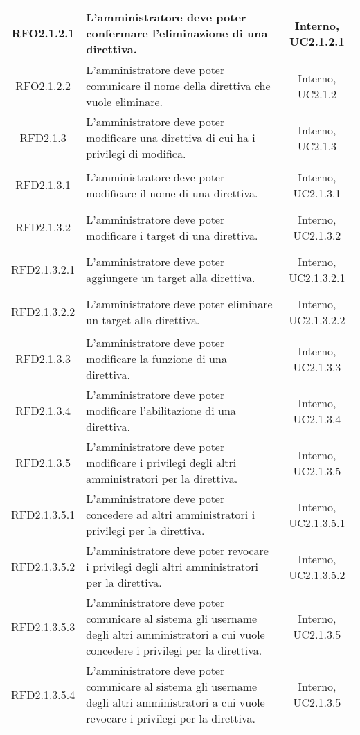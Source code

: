 \begin{longtable}{|c|>{\centering}m{7cm}|c|}
	\hypertarget{RFO2.1.2.1}{RFO2.1.2.1} & L'amministratore deve poter confermare l'eliminazione di una direttiva. & Interno, UC2.1.2.1\\ \hline
	\hypertarget{RFO2.1.2.2}{RFO2.1.2.2} & L'amministratore deve poter comunicare il nome della direttiva che vuole eliminare. & Interno, UC2.1.2\\ \hline
	\hypertarget{RFD2.1.3}{RFD2.1.3} & L'amministratore deve poter modificare una direttiva di cui ha i privilegi di modifica. & Interno, UC2.1.3\\ \hline
	\hypertarget{RFD2.1.3.1}{RFD2.1.3.1} & L'amministratore deve poter modificare il nome di una direttiva. & Interno, UC2.1.3.1\\ \hline
	\hypertarget{RFD2.1.3.2}{RFD2.1.3.2} & L'amministratore deve poter modificare i target di una direttiva. & Interno, UC2.1.3.2\\ \hline
	\hypertarget{RFD2.1.3.2.1}{RFD2.1.3.2.1} & L'amministratore deve poter aggiungere un target alla direttiva. & Interno, UC2.1.3.2.1\\ \hline
	\hypertarget{RFD2.1.3.2.2}{RFD2.1.3.2.2} & L'amministratore deve poter eliminare un target alla direttiva. & Interno, UC2.1.3.2.2\\ \hline
	\hypertarget{RFD2.1.3.3}{RFD2.1.3.3} & L'amministratore deve poter modificare la funzione di una direttiva. & Interno, UC2.1.3.3\\ \hline
	\hypertarget{RFD2.1.3.4}{RFD2.1.3.4} & L'amministratore deve poter modificare l'abilitazione di una direttiva. & Interno, UC2.1.3.4\\ \hline
	\hypertarget{RFD2.1.3.5}{RFD2.1.3.5} & L'amministratore deve poter modificare i privilegi degli altri amministratori per la direttiva. & Interno, UC2.1.3.5\\ \hline
	\hypertarget{RFD2.1.3.5.1}{RFD2.1.3.5.1} & L'amministratore deve poter concedere ad altri amministratori i privilegi per la direttiva. & Interno, UC2.1.3.5.1\\ \hline
	\hypertarget{RFD2.1.3.5.2}{RFD2.1.3.5.2} & L'amministratore deve poter revocare i privilegi degli altri amministratori per la direttiva. & Interno, UC2.1.3.5.2\\ \hline
	\hypertarget{RFD2.1.3.5.3}{RFD2.1.3.5.3} & L'amministratore deve poter comunicare al sistema gli username degli altri amministratori a cui vuole concedere i privilegi per la direttiva. & Interno, UC2.1.3.5\\ \hline
	\hypertarget{RFD2.1.3.5.4}{RFD2.1.3.5.4} & L'amministratore deve poter comunicare al sistema gli username degli altri amministratori a cui vuole revocare i privilegi per la direttiva. & Interno, UC2.1.3.5\\ \hline

\end{longtable}
